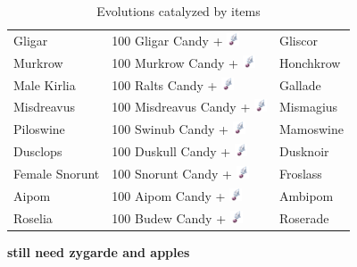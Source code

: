 \begin{table}[ht]
\begin{center}
\begin{tabular}{lll}
    Gligar & 100 Gligar Candy + \includegraphics[width=1em,height=1em]{images/sinnohstone.png} & Gliscor	\\
    Murkrow & 100 Murkrow Candy + \includegraphics[width=1em,height=1em]{images/sinnohstone.png} & Honchkrow	\\
    Male Kirlia & 100 Ralts Candy + \includegraphics[width=1em,height=1em]{images/sinnohstone.png} & Gallade	\\
    Misdreavus & 100 Misdreavus Candy + \includegraphics[width=1em,height=1em]{images/sinnohstone.png} & Mismagius	\\
    Piloswine & 100 Swinub Candy + \includegraphics[width=1em,height=1em]{images/sinnohstone.png} & Mamoswine	\\
    Dusclops & 100 Duskull Candy + \includegraphics[width=1em,height=1em]{images/sinnohstone.png} & Dusknoir	\\
    Female Snorunt & 100 Snorunt Candy + \includegraphics[width=1em,height=1em]{images/sinnohstone.png} & Froslass	\\
    Aipom & 100 Aipom Candy + \includegraphics[width=1em,height=1em]{images/sinnohstone.png} & Ambipom	\\
    Roselia & 100 Budew Candy + \includegraphics[width=1em,height=1em]{images/sinnohstone.png} & Roserade	\\
  \end{tabular}
\end{center}
\caption{Evolutions catalyzed by items}
\label{table:itemevolutions}
\end{table}
\textbf{still need zygarde and apples}

